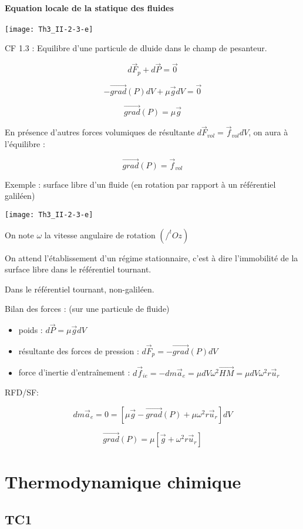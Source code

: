 \documentclass[a4paper,12pt]{book}
\newcommand{\grad}{\overrightarrow{grad}}
\begin{document}
\subsubsection{Equation locale de la statique des fluides}
\texttt{[image: Th3\_II-2-3-e]}
\par CF 1.3 : Equilibre d'une particule de dluide dans le champ de pesanteur.
\par $$ d\vec{F}_p +d\vec{P}=\vec{0}$$
\par $$-\overrightarrow{grad}(P)dV + \mu \vec{g}dV=\vec{0}$$
\par $$\overrightarrow{grad}(P) = \mu \vec{g}$$
\par En présence d'autres forces volumiques de résultante $d\vec{F}_{vol} = \vec{f}_{vol}dV$, on aura à l'équilibre :
\par $$ \overrightarrow{grad}(P) = \vec{f}_{vol}$$
\par Exemple : surface libre d'un fluide (en rotation par rapport à un référentiel galiléen)
\par \texttt{[image: Th3\_II-2-3-e]}
\par
\par On note $\omega$ la vitesse angulaire de rotation $(/^tOz)$
\par On attend l'établissement d'un régime stationnaire, c'est à dire l'immobilité de la surface libre dans le référentiel tournant.
\par Dans le référentiel tournant, non-galiléen.
\par Bilan des forces : (sur une particule de fluide)\begin{itemize}
\item poids : $d\vec{P} = \mu\vec{g}dV$
\item résultante des forces de pression : $d\vec{F}_p = -\overrightarrow{grad}(P)dV$
\item force d'inertie d'entraînement : $d\vec{f}_{ie} = -dm\vec{a}_e = \mu dV\omega^2\vec{HM} = \mu dV\omega^2 r\vec{u}_r$
\end{itemize}
RFD/SF:
\par $$ dm\vec{a}_e = 0 = \left[\mu\vec{g}-\grad(P)+\mu\omega^2r\vec{u}_r\right]dV$$
\par $$\grad(P) = \mu \left[\vec{g}+\omega^2r\vec{u}_r\right]$$


\chapter{Thermodynamique chimique}
\section{TC1}
\end{document}
